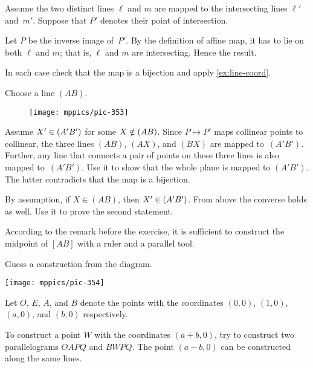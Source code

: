 \begin{multicols}{2}
\setcounter{eqtn}{0}

Assume the two distinct lines $\ell$ and $m$ 
are mapped to the intersecting lines $\ell'$ and~$m'$.
Suppose that $P'$ denotes their point of intersection.

Let $P$ be the inverse image of~$P'$.
By the definition of affine map, it has to lie on both $\ell$ and $m$;
that is, $\ell$ and $m$ are intersecting.
Hence the result.

In each case check that the map is a bijection and apply \ref{ex:line-coord}.

Choose a line $(AB)$.

{

\begin{wrapfigure}{o}{20mm}
\vskip-2mm
\centering
\texttt{[image: mppics/pic-353]}
\end{wrapfigure}

Assume $X'\z\in (A'B')$ for some $X\z\notin(AB)$.
Since $P\mapsto P'$ maps collinear points to collinear, 
the three lines $(AB)$, $(AX)$, and $(BX)$ are mapped to~$(A'B')$.
Further, any line that connects a pair of points on these three lines is also mapped to~$(A'B')$.
Use it to show that the whole plane is mapped to $(A'B')$.
The latter contradicts that the map is a bijection.

}

By assumption, if $X\in (AB)$, then $X'\z\in (A'B')$.
From above the converse holds as well.
Use it to prove the second statement.

According to the remark before the exercise,
it is sufficient to construct the midpoint of $[AB]$
with a ruler and a parallel tool.

Guess a construction from the diagram.

\begin{Figure}
\vskip-0mm
\centering
\texttt{[image: mppics/pic-354]}
\end{Figure}

Let $O$, $E$, $A$, and $B$ denote the points with the coordinates $(0,0)$, $(1,0)$, $(a,0)$, and $(b,0)$ respectively.

To construct a point $W$ with the coordinates $(a+b,0)$, try to construct two parallelograms $OAPQ$ and $BWPQ$.
The point $(a-b,0)$ can be constructed along the same lines.


\end{multicols}
